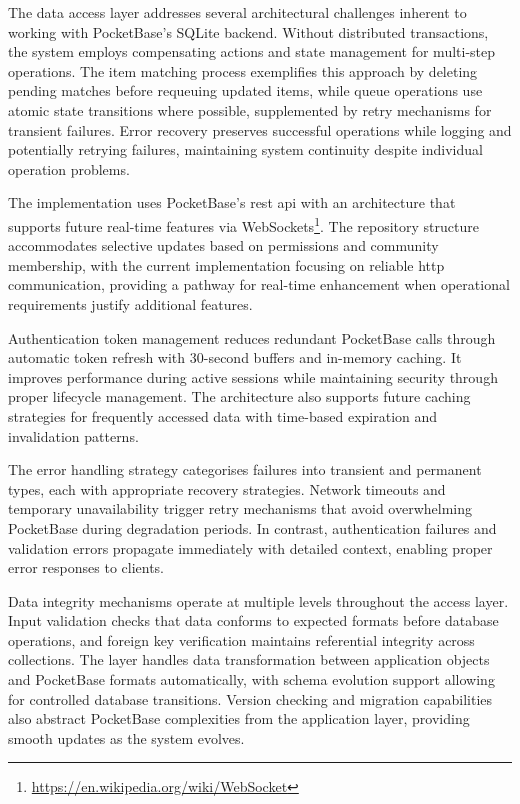 The data access layer addresses several architectural challenges inherent to working with PocketBase's SQLite backend. Without distributed transactions, the system employs compensating actions and state management for multi-step operations. The item matching process exemplifies this approach by deleting pending matches before requeuing updated items, while queue operations use atomic state transitions where possible, supplemented by retry mechanisms for transient failures. Error recovery preserves successful operations while logging and potentially retrying failures, maintaining system continuity despite individual operation problems.

The implementation uses PocketBase's \ac{rest} \ac{api} with an architecture that supports future real-time features via WebSockets\footnote{\url{https://en.wikipedia.org/wiki/WebSocket}}. The repository structure accommodates selective updates based on permissions and community membership, with the current implementation focusing on reliable \ac{http} communication, providing a pathway for real-time enhancement when operational requirements justify additional features.

Authentication token management reduces redundant PocketBase calls through automatic token refresh with 30-second buffers and in-memory caching. It improves performance during active sessions while maintaining security through proper lifecycle management. The architecture also supports future caching strategies for frequently accessed data with time-based expiration and invalidation patterns.

The error handling strategy categorises failures into transient and permanent types, each with appropriate recovery strategies. Network timeouts and temporary unavailability trigger retry mechanisms that avoid overwhelming PocketBase during degradation periods. In contrast, authentication failures and validation errors propagate immediately with detailed context, enabling proper error responses to clients.

Data integrity mechanisms operate at multiple levels throughout the access layer. Input validation checks that data conforms to expected formats before database operations, and foreign key verification maintains referential integrity across collections. The layer handles data transformation between application objects and PocketBase formats automatically, with schema evolution support allowing for controlled database transitions. Version checking and migration capabilities also abstract PocketBase complexities from the application layer, providing smooth updates as the system evolves.

